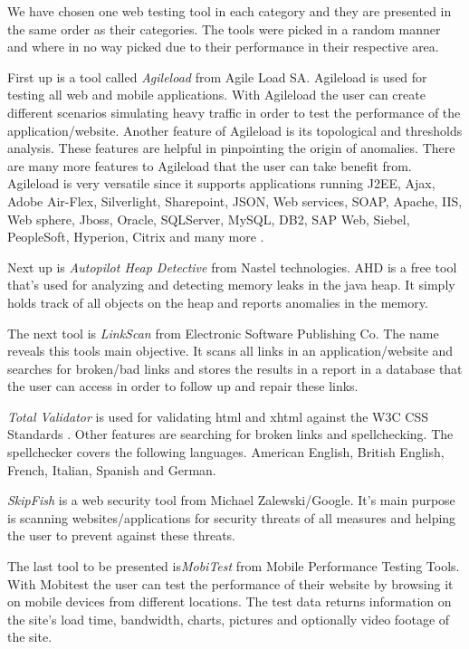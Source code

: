 \documentclass[a4paper, twocolumn]{ieee}
\begin{document}
We have chosen one web testing tool in each category and they are presented in the same order as their categories. 
The tools were picked in a random manner and where in no way picked due to their performance in their respective area.
 
First up is a tool called \emph {Agileload} from Agile Load SA. Agileload is used for testing all web and mobile applications.
With Agileload the user can create different scenarios simulating heavy traffic in order to test the performance of the
application/website. Another feature of Agileload is its topological and thresholds analysis. These features are helpful 
in pinpointing the origin of anomalies. There are many more features to Agileload that the user can take benefit from.
Agileload is very versatile since
it supports
applications
running J2EE,
Ajax, Adobe Air-Flex, Silverlight, Sharepoint, JSON, 
Web services, SOAP, Apache, IIS, Web sphere, Jboss, Oracle, SQLServer, MySQL, DB2, SAP Web, Siebel, PeopleSoft, Hyperion, 
Citrix and
many more \cite{agileload}.
 
Next up is \emph{Autopilot Heap Detective} from Nastel technologies.
AHD is a free tool that's used for analyzing and detecting 
memory leaks in the java heap. It simply holds track of all objects on the heap and reports anomalies in the memory. \cite{ahd}
 
The next tool is \emph{LinkScan} from Electronic Software Publishing Co. The name reveals this tools main objective. It scans all 
links in an application/website and searches for broken/bad links and stores the results in a report in a database that the 
user can access in order to follow up and repair these links. \cite{links} 
 
\emph {Total Validator} is used for validating html and xhtml against the W3C CSS Standards \cite{w3}. Other features are searching 
for broken links and spellchecking. The spellchecker covers the following languages. American English, British English,
French, Italian, Spanish and German.\cite{totval} 

\emph {SkipFish} is a web security tool from Michael Zalewski/Google. It's main purpose is scanning websites/applications for 
security threats of all measures and helping the user to prevent against these threats. \cite{skipfish}
 
The last tool to be presented is\emph {MobiTest} from Mobile Performance Testing Tools.  With Mobitest the user can test the 
performance of their website by browsing it on mobile devices from different locations. The test data returns information 
on the site’s load time, bandwidth, charts, pictures and optionally video footage of the site. \cite{mobitest} 
 
\end{document}
